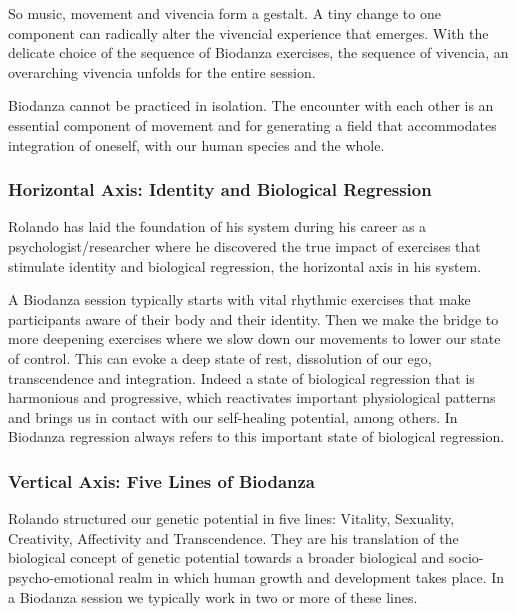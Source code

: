\documentclass[
  11pt,
]{book}
\begin{document}
So music, movement and vivencia form a gestalt. A tiny change to one component can radically alter the vivencial experience that emerges.
With the delicate choice of the sequence of Biodanza exercises, the sequence of vivencia, an overarching vivencia unfolds for the entire session.

Biodanza cannot be practiced in isolation. The encounter with each other is an essential component of movement and for generating a field that accommodates integration of oneself, with our human species and the whole.

\hypertarget{horizontal-axis-identity-and-biological-regression}{%
\subsubsection{Horizontal Axis: Identity and Biological Regression}\label{horizontal-axis-identity-and-biological-regression}}

Rolando has laid the foundation of his system during his career as a psychologist/researcher where he discovered the true impact of exercises that stimulate identity and biological regression, the horizontal axis in his system.

A Biodanza session typically starts with vital rhythmic exercises that make participants aware of their body and their identity.
Then we make the bridge to more deepening exercises where we slow down our movements to lower our state of control. This can evoke a deep state of rest, dissolution of our ego, transcendence and integration. Indeed a state of biological regression that is harmonious and progressive, which reactivates important physiological patterns and brings us in contact with our self-healing potential, among others. In Biodanza regression always refers to this important state of biological regression.

\hypertarget{vertical-axis-five-lines-of-biodanza}{%
\subsubsection{Vertical Axis: Five Lines of Biodanza}\label{vertical-axis-five-lines-of-biodanza}}

Rolando structured our genetic potential in five lines: Vitality, Sexuality, Creativity, Affectivity and Transcendence. They are his translation of the biological concept of genetic potential towards a broader biological and socio-psycho-emotional realm in which human growth and development takes place.
In a Biodanza session we typically work in two or more of these lines.
\end{document}
